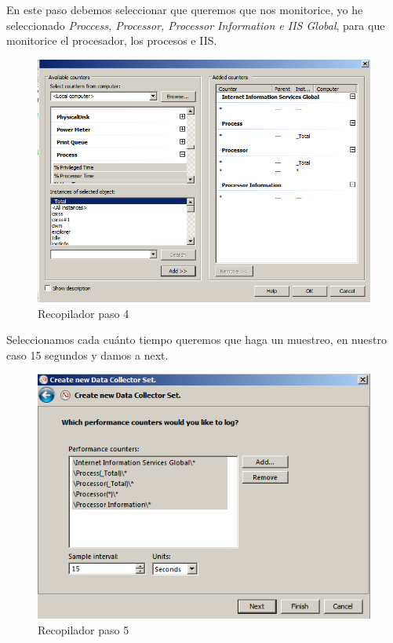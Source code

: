 En este paso debemos seleccionar que queremos que nos monitorice, yo he seleccionado \textit{Proccess, Processor, Processor Information e IIS Global}, para que monitorice el procesador, los procesos e IIS.
\begin{figure}[H] %
	\centering
	\includegraphics[scale=0.5]{pics/recopilador4.png}  %
	\caption{Recopilador paso 4} \label{fig:reco4}
\end{figure}

Seleccionamos cada cuánto tiempo queremos que haga un muestreo, en nuestro caso 15 segundos y damos a next.

\begin{figure}[H] %
	\centering
	\includegraphics[scale=0.5]{pics/recopilador5.png}  %
	\caption{Recopilador paso 5} \label{fig:reco5}
\end{figure}


